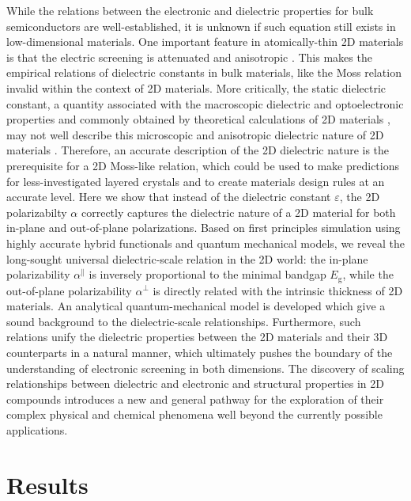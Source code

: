 \documentclass[journal=ancac3,manuscript=article,email=true,hyperref=true,keywords=false]{achemso}
\begin{document}
While the relations between the electronic and dielectric properties
for bulk semiconductors are well-established, it is unknown if such
equation still exists in low-dimensional materials. One important
feature in atomically-thin 2D materials \cite{Novoselov_2016} is that
the electric screening is attenuated and anisotropic
\cite{Keldysh_1979_eps_multi,Sharma_1985,Low_2014_screening_BP,Cudazzo_2011_screening_2D,Bechstedt_2012}. This
makes the empirical relations of dielectric constants in bulk
materials, like the Moss relation invalid within the context of 2D
materials. More critically, the static dielectric constant, a quantity
associated with the macroscopic dielectric and optoelectronic
properties and commonly obtained by theoretical calculations of 2D
materials \cite{Ramasubramaniam_2012,Wang_2016_Aip,Laturia_2018}, may
not well describe this microscopic and anisotropic dielectric nature
of 2D materials
\cite{Cudazzo_2010_screen2D,Cudazzo_2011_screening_2D}. Therefore, an
accurate description of the 2D dielectric nature is the prerequisite
for a 2D Moss-like relation, which could be used to make predictions
for less-investigated layered crystals and to create materials design
rules at an accurate level.  Here we show that instead of the
dielectric constant $\varepsilon$, the 2D polarizabilty $\alpha$
correctly captures the dielectric nature of a 2D material for both
in-plane and out-of-plane polarizations. Based on first principles
simulation using highly accurate hybrid functionals and quantum
mechanical models, we reveal the long-sought universal
dielectric-scale relation in the 2D world: the in-plane polarizability
$\alpha^{\parallel}$ is inversely proportional to the minimal bandgap
$E_{\mathrm{g}}$, while the out-of-plane polarizability
$\alpha^{\perp}$ is directly related with the intrinsic thickness of
2D materials. An analytical quantum-mechanical model is developed
which give a sound background to the dielectric-scale
relationships. Furthermore, such relations unify the dielectric
properties between the 2D materials and their 3D counterparts in a
natural manner, which ultimately pushes the boundary of the
understanding of electronic screening in both dimensions. The
discovery of scaling relationships between dielectric and electronic
and structural properties in 2D compounds introduces a new and general
pathway for the exploration of their complex physical and chemical
phenomena well beyond the currently possible applications.

\section{Results}
\label{sec:org752ca78}
\end{document}
